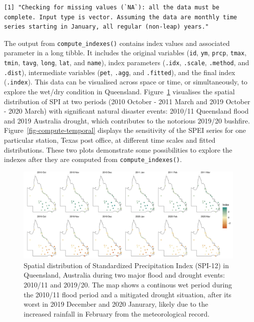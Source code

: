 \documentclass[
]{interact}
\begin{document}
\begin{verbatim}
[1] "Checking for missing values (`NA`): all the data must be complete. Input type is vector. Assuming the data are monthly time series starting in January, all regular (non-leap) years."
\end{verbatim}

The output from \texttt{compute\_indexes()} contains index values and
associated parameter in a long tibble. It includes the original
variables (\texttt{id}, \texttt{ym}, \texttt{prcp}, \texttt{tmax},
\texttt{tmin}, \texttt{tavg}, \texttt{long}, \texttt{lat}, and
\texttt{name}), index parameters (\texttt{.idx}, \texttt{.scale},
\texttt{.method}, and \texttt{.dist}), intermediate variables
(\texttt{pet}, \texttt{.agg}, and \texttt{.fitted}), and the final index
(\texttt{.index}). This data can be visualised across space or time, or
simultaneously, to explore the wet/dry condition in Queensland.
Figure~\ref{fig-compute-spatial} visualises the spatial distribution of
SPI at two periods (2010 October - 2011 March and 2019 October - 2020
March) with significant natural disaster events: 2010/11 Queensland
flood and 2019 Australia drought, which contributes to the notorious
2019/20 bushfire. Figure~\ref{fig-compute-temporal} displays the
sensitivity of the SPEI series for one particular station, Texas post
office, at different time scales and fitted distributions. These two
plots demonstrate some possibilities to explore the indexes after they
are computed from \texttt{compute\_indexes()}.

\begin{figure}

{\centering \includegraphics{tidyindex_files/figure-pdf/fig-compute-spatial-1.pdf}

}

\caption{\label{fig-compute-spatial}Spatial distribution of Standardized
Precipitation Index (SPI-12) in Queensland, Australia during two major
flood and drought events: 2010/11 and 2019/20. The map shows a continous
wet period during the 2010/11 flood period and a mitigated drought
situation, after its worst in 2019 December and 2020 Janurary, likely
due to the increased rainfall in February from the meteorological
record.}

\end{figure}
\end{document}
